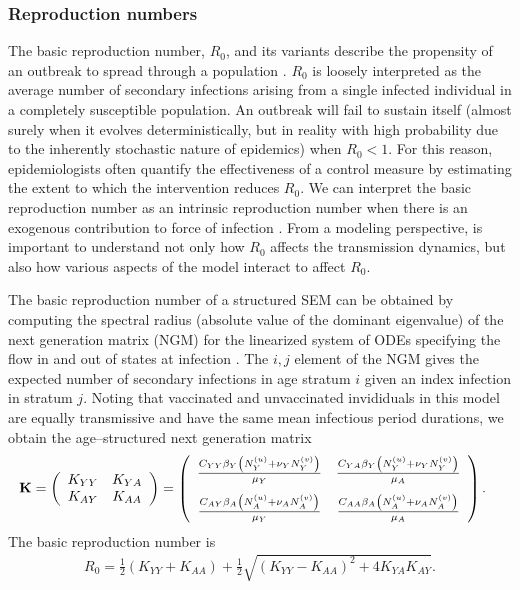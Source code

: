 \subsubsection{Reproduction numbers}
\label{subsubsec:stratmod_repnumbs}
The basic reproduction number, $ R_0 $, and its variants describe the propensity of an outbreak to spread through a population \cite{heffernan2005perspectives,van2008further}. $ R_0 $ is loosely interpreted as the average number of secondary infections arising from a single infected individual in a completely susceptible population. An outbreak will fail to sustain itself (almost surely when it evolves deterministically, but in reality with high probability due to the inherently stochastic nature of epidemics) when $ R_0 < 1 $. For this reason, epidemiologists often quantify the effectiveness of a control measure by estimating the extent to which the intervention reduces $ R_0 $. We can interpret the basic reproduction number as an intrinsic reproduction number when there is an exogenous contribution to force of infection \cite{blackwood2018introduction}. From a modeling perspective, is important to understand not only how $ R_0 $ affects the transmission dynamics, but also how various aspects of the model interact to affect $ R_0 $. 

The basic reproduction number of a structured SEM can be obtained by computing the spectral radius (absolute value of the dominant eigenvalue) of the next generation matrix (NGM) for the linearized system of ODEs specifying the flow in and out of states at infection \cite{heffernan2005perspectives,van2017reproduction,van2008further}. The $ i,j $ element of the NGM gives the expected number of secondary infections in age stratum $ i $ given an index infection in stratum $ j $. Noting that vaccinated and unvaccinated invididuals in this model are equally transmissive and have the same mean infectious period durations, we obtain the age--structured next generation matrix
\begin{align}
\label{eqn:sirs_ngm_full}
\mathbf{K} &= 
	\left (
	\begin{array}{cc}
	K_{YY} & K_{YA} \\
	K_{AY} & K_{AA}
	\end{array}
	\right ) =\left (
	\begin{array}{cc}
	\frac{C_{YY}\beta_Y\left (N_Y^{(u)} + \nu_YN_Y^{(v)}\right )}{\mu_Y} & \frac{C_{YA}\beta_Y\left (N_Y^{(u)} + \nu_YN_Y^{(v)}\right )}{\mu_A} \\[2ex]
	\frac{C_{AY}\beta_A\left (N_A^{(u)} + \nu_AN_A^{(v)}\right )}{\mu_Y} & \frac{C_{AA}\beta_A\left (N_A^{(u)} + \nu_AN_A^{(v)}\right )}{\mu_A}
	\end{array}
	\right ).
\end{align}
The basic reproduction number is 
\begin{align}
\label{eqn:sirs_R0}
R_0 = \frac{1}{2}\left (K_{YY} + K_{AA}\right ) + \frac{1}{2}\sqrt{(K_{YY} - K_{AA})^2 + 4K_{YA}K_{AY}}.
\end{align}


